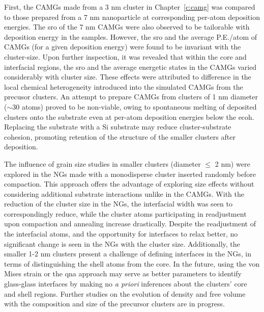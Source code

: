 First, the CAMGs made from a 3 nm cluster in Chapter~\ref{c:camg} was compared to those prepared from a 7 nm nanoparticle at corresponding per-atom deposition energies. The \gls{sro} of the 7 nm CAMGs were also observed to be tailorable with deposition energy in the samples. However, the \gls{sro} and the average P.E./atom of CAMGs (for a given deposition energy) were found to be invariant with the cluster-size. Upon further inspection, it was revealed that within the core and interfacial regions, the \gls{sro} and the average energetic states in the CAMGs varied considerably with cluster size. These effects were attributed to difference in the local chemical heterogeneity introduced into the simulated CAMGs from the precusor clusters. An attempt to prepare CAMGs from clusters of 1 nm diameter ($\sim$30 atoms) proved to be non-viable, owing to spontaneous melting of deposited clusters onto the substrate even at per-atom deposition energies below the \cz \gls{ecoh}. Replacing the \cz substrate with a Si substrate may reduce cluster-substrate cohesion, promoting retention of the structure of the smaller clusters after deposition. %

The influence of grain size studies in smaller clusters (diameter $\leq$ 2 nm) were explored in the \cz NGs made with a monodisperse cluster inserted randomly before compaction. This approach offers the advantage of exploring size effects without considering additional substrate interactions unlike in the CAMGs. With the reduction of the cluster size in the NGs, the interfacial width was seen to correspondingly reduce, while the cluster atoms participating in readjustment upon compaction and annealing increase drastically. Despite the readjustment of the interfacial atoms, and the opportunity for interfaces to relax better, no significant change is seen in the NGs with the cluster size. Additionally, the smaller 1-2 nm clusters present a challenge of defining interfaces in the NGs, in terms of distinguishing the shell atoms from the core. In the future, using the von Mises strain or the \gls{qna} approach \cite{Feng2020} may serve as better parameters to identify glass-glass interfaces by making no \textit{a priori} inferences about the clusters' core and shell regions. Further studies on the evolution of density and free volume with the composition and size of the precursor clusters are in progress. \par


